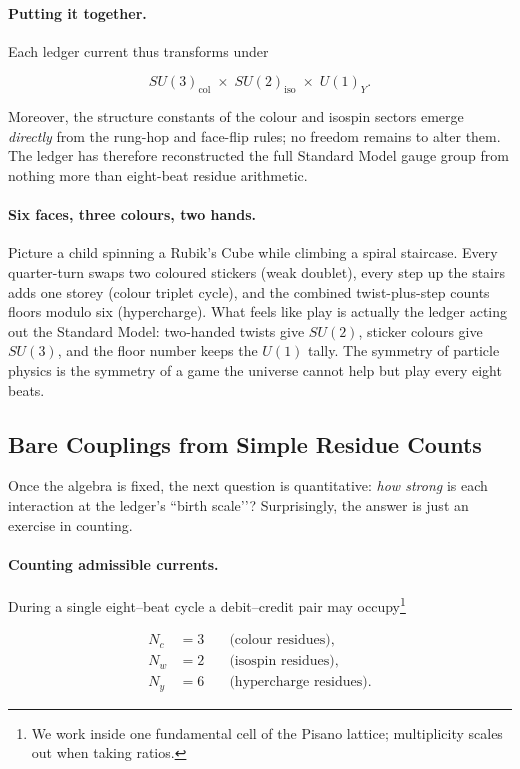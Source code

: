 \documentclass[11pt]{article}
\begin{document}
\paragraph{Putting it together.}
Each ledger current thus transforms under

\[
SU(3)_{\text{col}}\;\times\;SU(2)_{\text{iso}}\;\times\;U(1)_{Y}.
\]

Moreover, the structure constants of the colour and isospin sectors
emerge \emph{directly} from the rung-hop and face-flip rules; no freedom
remains to alter them.
The ledger has therefore reconstructed the full Standard Model gauge
group from nothing more than eight-beat residue arithmetic.

\paragraph{Six faces, three colours, two hands.}
Picture a child spinning a Rubik’s Cube while climbing a spiral
staircase.
Every quarter-turn swaps two coloured stickers (weak doublet),
every step up the stairs adds one storey (colour triplet cycle),
and the combined twist-plus-step counts floors modulo six
(hypercharge).
What feels like play is actually the ledger acting out the Standard
Model: two-handed twists give \(SU(2)\), sticker colours give \(SU(3)\),
and the floor number keeps the \(U(1)\) tally.
The symmetry of particle physics is the symmetry of a game the universe
cannot help but play every eight beats.

\subsection{Bare Couplings from Simple Residue Counts}
\label{subsec:bare-couplings}

Once the algebra is fixed, the next question is quantitative:
\emph{how strong} is each interaction at the ledger’s “birth scale’’?
Surprisingly, the answer is just an exercise in counting.

\paragraph{Counting admissible currents.}
During a single eight–beat cycle a debit–credit pair may occupy\footnote{We
work inside one fundamental cell of the Pisano lattice; multiplicity
scales out when taking ratios.}

\[
\begin{aligned}
N_{c} &= 3 \quad&\text{(colour residues)},\\
N_{w} &= 2 \quad&\text{(isospin residues)},\\
N_{y} &= 6 \quad&\text{(hypercharge residues)}.
\end{aligned}
\]
\end{document}
